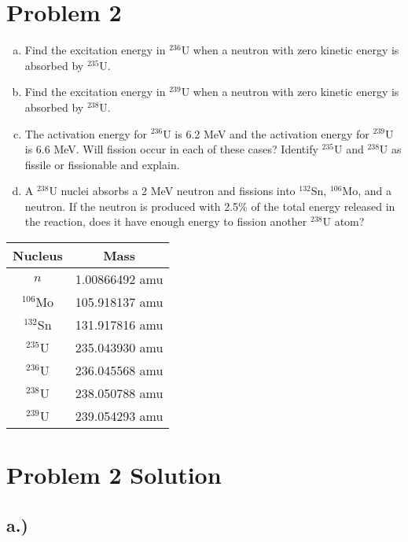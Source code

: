 \documentclass{report}
\newcommand{\tab}{\-\hspace{1.5cm}}
\begin{document}
\newpage
\section*{Problem 2}

\begin{enumerate}[a)]
\item Find the excitation energy in $^{236}$U when a neutron with zero kinetic energy is absorbed by $^{235}$U. 
\item Find the excitation energy in $^{239}$U when a neutron with zero kinetic energy is absorbed by $^{238}$U. 
\item The activation energy for $^{236}$U is 6.2 MeV and the activation energy for $^{239}$U is 6.6 MeV. Will fission occur in each of these cases? Identify $^{235}$U and $^{238}$U as fissile or fissionable and explain.
\item A $^{238}$U nuclei absorbs a 2 MeV neutron and fissions into $^{132}$Sn, $^{106}$Mo, and a neutron. If the neutron is produced with 2.5\% of the total energy released in the reaction, does it have enough energy to fission another $^{238}$U atom?
\end{enumerate}

\begin{table}[htbp]
	\centering
	\begin{tabular}{|c|c|}
			\hline
			Nucleus		&	\tab\- Mass \tab\- \\
			\hline	
			$n$			&  1.00866492 amu \\
			$^{106}$Mo	&  105.918137 amu \\
			$^{132}$Sn	&  131.917816 amu \\
			$^{235}$U	&  235.043930 amu \\
			$^{236}$U	&  236.045568 amu \\	
			$^{238}$U	&  238.050788 amu \\
			$^{239}$U	&  239.054293 amu \\
			\hline
	\end{tabular}
	\label{tab:design-specs}
\end{table}



\section*{Problem 2 Solution}

\subsection*{a.)}
\end{document}
